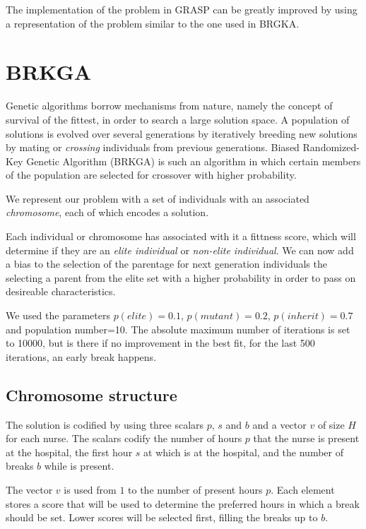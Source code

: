 \documentclass[12pt,a4paper]{article}
\begin{document}
The implementation of the problem in GRASP can be greatly improved by using a 
representation of the problem similar to the one used in BRGKA.

\section{BRKGA}
%
Genetic algorithms borrow mechanisms from nature, namely the concept of survival 
of the fittest, in order to search a large solution space. A population of 
solutions is evolved over several generations by iteratively breeding new 
solutions by mating or \textit{crossing} individuals from previous generations.  
Biased Randomized-Key Genetic Algorithm (BRKGA) is such an algorithm in which 
certain members of the population are selected for crossover with higher 
probability.

We represent our problem with a set of individuals with an associated 
\textit{chromosome}, each of which encodes a solution.

Each individual or chromosome has associated with it a fittness score, which 
will determine if they are an \textit{elite individual} or \textit{non-elite 
individual}. We can now add a bias to the selection of the parentage for next 
generation individuals the selecting a parent from the elite set with a higher 
probability in order to pass on desireable characteristics.

We used the parameters $p(elite) = 0.1$, $p(mutant) = 0.2$, $p(inherit) = 0.7$ 
and population number=10. The absolute maximum number of iterations is set to 
10000, but is there if no improvement in the best fit, for the last 500 
iterations, an early break happens.

\subsection{Chromosome structure}

The solution is codified by using three scalars $p$, $s$ and $b$ and a vector 
$v$ of size $H$ for each nurse. The scalars codify the number of hours $p$ that 
the nurse is present at the hospital, the first hour $s$ at which is at the 
hospital, and the number of breaks $b$ while is present.

The vector $v$ is used from $1$ to the number of present hours $p$. Each element 
stores a score that will be used to determine the preferred hours in which a 
break should be set. Lower scores will be selected first, filling the breaks up 
to $b$.
\end{document}
